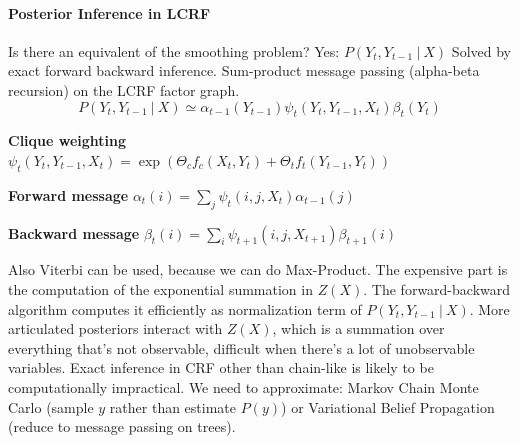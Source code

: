 \documentclass[10pt]{report}
\begin{document}
\paragraph{Posterior Inference in LCRF} Is there an equivalent of the smoothing problem? Yes: $P(Y_t, Y_{t-1}\:|\:X)$
Solved by exact forward backward inference. Sum-product message passing (alpha-beta recursion) on the LCRF factor graph.
$$P(Y_t,Y_{t-1}\:|\:X)\simeq\alpha_{t-1}(Y_{t-1})\psi_t(Y_t,Y_{t-1},X_t)\beta_t(Y_t)$$
\begin{list}{}{}
	\item \textbf{Clique weighting} $\psi_t(Y_t,Y_{t-1},X_t)=\exp(\Theta_cf_c(X_t,Y_t)+\Theta_tf_t(Y_{t-1},Y_t))$
	\item \textbf{Forward message} $\alpha_t(i) = \sum_j\psi_t(i,j,X_t)\alpha_{t-1}(j)$
	\item \textbf{Backward message} $\beta_t(i) = \sum_i\psi_{t+1}(i,j,X_{t+1})\beta_{t+1}(i)$
\end{list}
Also Viterbi can be used, because we can do Max-Product. The expensive part is the computation of the exponential summation in $Z(X)$. The forward-backward algorithm computes it efficiently as normalization term of $P(Y_t,Y_{t-1}\:|\:X)$. More articulated posteriors interact with $Z(X)$, which is a summation over everything that's not observable, difficult when there's a lot of unobservable variables. Exact inference in CRF other than chain-like is likely to be computationally impractical. We need to approximate: Markov Chain Monte Carlo (sample $y$ rather than estimate $P(y)$) or Variational Belief Propagation (reduce to message passing on trees).
\end{document}
